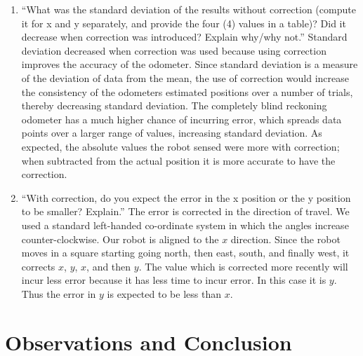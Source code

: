 \documentclass[twocolumn]{article}
\begin{document}
\begin{enumerate}

\item ``What was the standard deviation of the results without correction (compute it for x and y separately, and provide the four (4) values in a table)? Did it decrease when correction was introduced? Explain why/why not.\cite{lab2}'' Standard deviation decreased when correction was used because using correction improves the accuracy of the odometer. Since standard deviation is a measure of the deviation of data from the mean, the use of correction would increase the consistency of the odometers estimated positions over a number of trials, thereby decreasing standard deviation. The completely blind reckoning odometer has a much higher chance of incurring error, which spreads data points over a larger range of values, increasing standard deviation. As expected, the absolute values the robot sensed were more with correction; when subtracted from the actual position it is more accurate to have the correction.

\item ``With correction, do you expect the error in the x position or the y position to be smaller? Explain.'' The error is corrected in the direction of travel. We used a standard left-handed co-ordinate system in which the angles increase counter-clockwise. Our robot is aligned to the $x$ direction.
Since the robot moves in a square starting going north, then east, south, and finally west, it corrects $x$, $y$, $x$, and then $y$. The value which is corrected more recently will incur less error because it has less time to incur error. In this case it is $y$. Thus the error in $y$ is expected to be less than $x$.

\end{enumerate}

\section{Observations and Conclusion}
\end{document}
